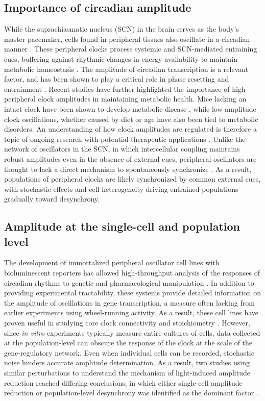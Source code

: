 \subsection{Importance of circadian amplitude}
While the suprachiasmatic nucleus (SCN) in the brain serves as the body's master pacemaker, cells found in peripheral tissues also oscillate in a circadian manner \cite{Lamia2008}.
These peripheral clocks process systemic and SCN-mediated entraining cues, buffering against rhythmic changes in energy availability to maintain metabolic homeostasis \cite{Kornmann2007}.
The amplitude of circadian transcription is a relevant factor, and has been shown to play a critical role in phase resetting and entrainment \cite{Pittendrigh1991, Abraham2010}.
Recent studies have further highlighted the importance of high peripheral clock amplitudes in maintaining metabolic health.
Mice lacking an intact clock have been shown to develop metabolic disease \cite{Marcheva2010}, while low amplitude clock oscillations, whether caused by diet \cite{Hatori2012} or age \cite{Chang2013} have also been tied to metabolic disorders.
An understanding of how clock amplitudes are regulated is therefore a topic of ongoing research with potential therapeutic applications \cite{St.John2014}.
Unlike the network of oscillators in the SCN, in which intercellular coupling maintains robust amplitudes even in the absence of external cues, peripheral oscillators are thought to lack a direct mechanism to spontaneously synchronize \cite{Welsh2004}.
As a result, populations of peripheral clocks are likely synchronized by common external cues, with stochastic effects and cell heterogeneity driving entrained populations gradually toward desynchrony.

\subsection{Amplitude at the single-cell and population level}
The development of immortalized peripheral oscillator cell lines with bioluminescent reporters has allowed high-throughput analysis of the responses of circadian rhythms to genetic and pharmacological manipulation \cite{Hirota2010, Ramanathan2014}.
In addition to providing experimental tractability, these systems provide detailed information on the amplitude of oscillations in gene transcription, a measure often lacking from earlier experiments using wheel-running activity.
 As a result, these cell lines have proven useful in studying core clock connectivity and stoichiometry \cite{Baggs2009}.
However, since {\itshape in vitro} experiments typically measure entire cultures of cells, data collected at the population-level can obscure the response of the clock at the scale of the gene-regulatory network.
Even when individual cells can be recorded, stochastic noise hinders accurate amplitude determination.
As a result, two studies using similar perturbations to understand the mechanism of light-induced amplitude reduction reached differing conclusions, in which either single-cell amplitude reduction or population-level desynchrony was identified as the dominant factor \cite{Pulivarthy2007, Ukai2007}.

